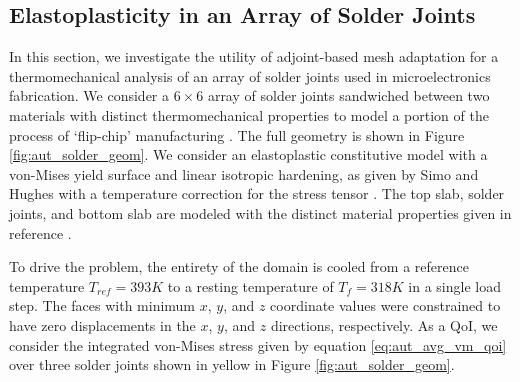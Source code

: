 \subsection{Elastoplasticity in an Array of Solder Joints}

In this section, we investigate the utility of adjoint-based mesh
adaptation for a thermomechanical analysis of an array of solder
joints used in microelectronics fabrication. We consider a
$6 \times 6$ array of solder joints sandwiched between two materials
with distinct thermomechanical properties
to model a portion of the process of `flip-chip'
manufacturing \cite{bloomfield2017component}. The full geometry
is shown in Figure \ref{fig:aut_solder_geom}. We consider
an elastoplastic constitutive model with a von-Mises yield
surface and linear isotropic hardening, as given by
Simo and Hughes \cite{simo2006computational} with a temperature
correction for the stress tensor \cite{li2017simulation}. The top
slab, solder joints, and bottom slab are modeled with the
distinct material properties given in reference
\cite{bloomfield2017component}.

To drive the problem, the entirety of the domain is cooled
from a reference temperature $T_{ref} = 393K$ to a
resting temperature of $T_{f} = 318K$ in a single load
step. The faces with minimum $x$, $y$, and $z$ coordinate
values were constrained to have zero displacements in
the $x$, $y$, and $z$ directions, respectively. As a
QoI, we consider the integrated von-Mises stress given by
equation \eqref{eq:aut_avg_vm_qoi} over three solder joints
shown in yellow in Figure \ref{fig:aut_solder_geom}.

